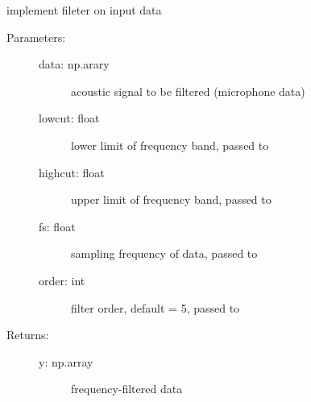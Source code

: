 \documentclass[letterpaper,10pt,english]{sphinxmanual}
\begin{document}
\begin{fulllineitems}
\label{\detokenize{code:ATom.atom_functions.butter_bandpass_filter}}
implement fileter on input data
\begin{description}
\item[{Parameters:}] \leavevmode\begin{description}
\item[{data: np.arary}] \leavevmode
acoustic signal to be filtered (microphone data)

\item[{lowcut: float}] \leavevmode
lower limit of frequency band, passed to 

\item[{highcut: float}] \leavevmode
upper limit of frequency band, passed to 

\item[{fs: float}] \leavevmode
sampling frequency of data, passed to 

\item[{order: int}] \leavevmode
filter order, default = 5, passed to 

\end{description}

\item[{Returns:}] \leavevmode\begin{description}
\item[{y: np.array}] \leavevmode
frequency-filtered data

\end{description}

\end{description}

\end{fulllineitems}

\end{document}
